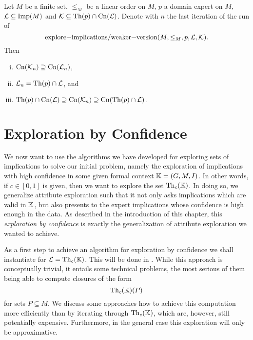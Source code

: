 \begin{Theorem}
  \label{thm:explore-implications-weaker-version-all-other-properties}
  Let $M$ be a finite set, $\leq_{M}$ be a linear order on $M$, $p$ a domain expert on
  $M$, $\mathcal{L} \subseteq \operatorname{Imp}(M)$ and $\mathcal{K} \subseteq \operatorname{Th}(p) \cap
  \operatorname{Cn}(\mathcal{L})$.  Denote with $n$ the last iteration of the run of
  \begin{equation*}
    \text{\lstinline{explore-implications/weaker-version}}(M, \leq_{M}, p, \mathcal{L}, \mathcal{K}).
  \end{equation*}
  Then
  \begin{enumerate}[i. ]
  \item $\operatorname{Cn}(\mathcal{K}_{n}) \supseteq \operatorname{Cn}(\mathcal{L}_{n})$,
  \item $\mathcal{L}_{n} = \operatorname{Th}(p) \cap \mathcal{L}$, and
  \item $\operatorname{Th}(p) \cap \operatorname{Cn}(\mathcal{L}) \supseteq \operatorname{Cn}(\mathcal{K}_{n}) \supseteq \operatorname{Cn}(\operatorname{Th}(p) \cap \mathcal{L})$.
  \end{enumerate}
\end{Theorem}

\section{Exploration by Confidence}
\label{sec:expl-conf}

We now want to use the algorithms we have developed for exploring sets of implications to
solve our initial problem, namely the exploration of implications with high confidence in
some given formal context ${\mathbb{K}} = (G, M, I)$.  In other words, if $c \in [0,1]$ is
given, then we want to explore the set $\operatorname{Th}_{c}({\mathbb{K}})$.  In doing so, we generalize
attribute exploration such that it not only asks implications which are valid in ${\mathbb{K}}$,
but also presents to the expert implications whose confidence is high enough in the data.
As described in the introduction of this chapter, this \emph{exploration by confidence} is
exactly the generalization of attribute exploration we wanted to achieve.

As a first step to achieve an algorithm for exploration by confidence we shall instantiate
 for $\mathcal{L} = \operatorname{Th}_{c}({\mathbb{K}})$.  This will be done in
.  While this approach is conceptually trivial, it entails some
technical problems, the most serious of them being able to compute closures of the form
\begin{equation*}
  \operatorname{Th}_{c}({\mathbb{K}})(P)
\end{equation*}
for sets $P \subseteq M$.  We discuss some approaches how to achieve this computation more
efficiently than by iterating through $\operatorname{Th}_{c}({\mathbb{K}})$, which are, however, still
potentially expensive.  Furthermore, in the general case this exploration will only be
approximative.

